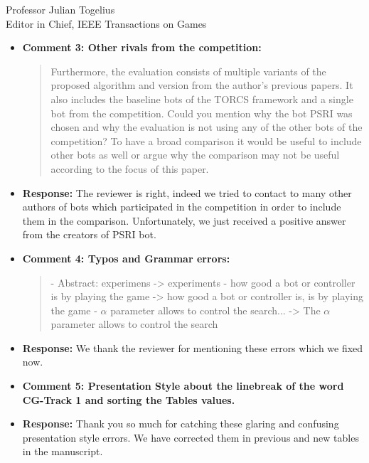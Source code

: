 \documentclass[10pt]{letter} %
\begin{document}
\begin{letter}{Professor Julian Togelius \\ Editor in Chief, IEEE Transactions on Games}
\begin{enumerate}
\begin{itemize}
		\item {\bf Comment 3: Other rivals from the competition:
		\begin{quote}
			Furthermore, the evaluation consists of multiple variants of the
			proposed algorithm and version from the author's previous papers. It 
			also includes the baseline bots of the TORCS framework and a single bot 
			from the competition. Could you mention why the bot PSRI was chosen and 
			why the evaluation is not using any of the other bots of the 
			competition? To have a broad comparison it would be useful to include 
			other bots as well or argue why the comparison may not be useful 
			according to the focus of this paper.		
		\end{quote}
		}
		\item {\bf Response:} The reviewer is right, indeed we tried to contact to many other authors of bots which participated in the competition in order to include them in the comparison. Unfortunately, we just received a positive answer from the creators of PSRI bot.


		\item {\bf Comment 4: Typos and Grammar errors:
		\begin{quote}
			- Abstract: experimens -> experiments
			- how good a bot or controller is by playing the game -> how good a bot
	  		  or controller is, is by playing the game
			- $\alpha$ parameter allows to control the search... -> The $\alpha$ 
           parameter allows to control the search
		\end{quote}
		}
		\item {\bf Response:} We thank the reviewer for mentioning these errors which we fixed now. 


		\item {\bf Comment 5: Presentation Style about the linebreak of the word CG-Track 1 and sorting the Tables values.}
		\item {\bf Response:} Thank you so much for catching these glaring and confusing presentation style errors. We have corrected them in previous and new tables in the manuscript.



\end{itemize}
\end{enumerate}
\end{letter}
\end{document}
